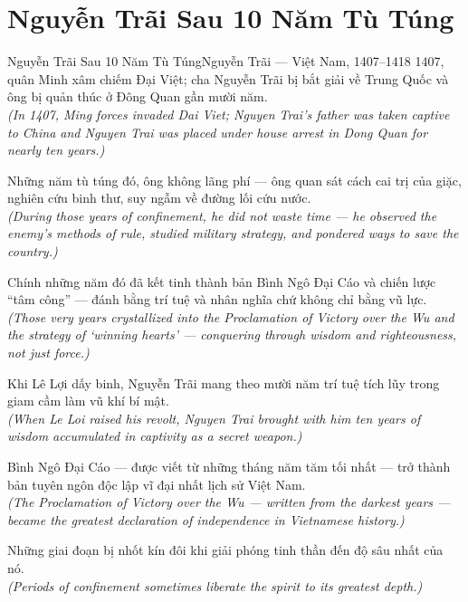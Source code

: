 \section{Nguyễn Trãi Sau 10 Năm Tù Túng}
\begin{truyen}{Nguyễn Trãi Sau 10 Năm Tù Túng}{Nguyễn Trãi --- Việt Nam, 1407--1418}
 1407, quân Minh xâm chiếm Đại Việt; cha Nguyễn Trãi bị bắt giải về Trung Quốc và ông bị quản thúc ở Đông Quan gần mười năm.\\[4pt]
\textit{(In 1407, Ming forces invaded Dai Viet; Nguyen Trai's father was taken captive to China and Nguyen Trai was placed under house arrest in Dong Quan for nearly ten years.)}

Những năm tù túng đó, ông không lãng phí --- ông quan sát cách cai trị của giặc, nghiên cứu binh thư, suy ngẫm về đường lối cứu nước.\\[4pt]
\textit{(During those years of confinement, he did not waste time --- he observed the enemy's methods of rule, studied military strategy, and pondered ways to save the country.)}

Chính những năm đó đã kết tinh thành bản Bình Ngô Đại Cáo và chiến lược ``tâm công'' --- đánh bằng trí tuệ và nhân nghĩa chứ không chỉ bằng vũ lực.\\[4pt]
\textit{(Those very years crystallized into the Proclamation of Victory over the Wu and the strategy of `winning hearts' --- conquering through wisdom and righteousness, not just force.)}

Khi Lê Lợi dấy binh, Nguyễn Trãi mang theo mười năm trí tuệ tích lũy trong giam cầm làm vũ khí bí mật.\\[4pt]
\textit{(When Le Loi raised his revolt, Nguyen Trai brought with him ten years of wisdom accumulated in captivity as a secret weapon.)}

Bình Ngô Đại Cáo --- được viết từ những tháng năm tăm tối nhất --- trở thành bản tuyên ngôn độc lập vĩ đại nhất lịch sử Việt Nam.\\[4pt]
\textit{(The Proclamation of Victory over the Wu --- written from the darkest years --- became the greatest declaration of independence in Vietnamese history.)}

\end{truyen}
\begin{baihoc}
  Những giai đoạn bị nhốt kín đôi khi giải phóng tinh thần đến độ sâu nhất của nó.\\[4pt]
  \textit{(Periods of confinement sometimes liberate the spirit to its greatest depth.)}
\end{baihoc}

